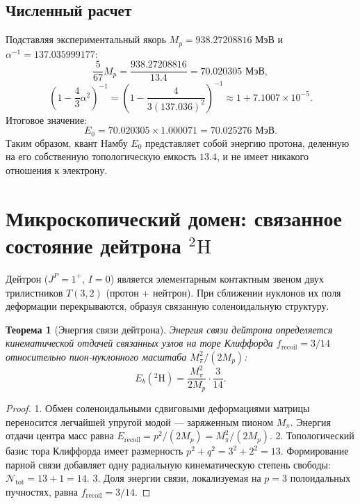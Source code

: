 \documentclass[11pt,a4paper]{article}
\newtheorem{theorem}{Теорема}
\theoremstyle{definition}
\theoremstyle{remark}
\begin{document}
\subsection{Численный расчет}
Подставляя экспериментальный якорь $M_p = 938.27208816\text{ МэВ}$ и $\alpha^{-1} = 137.035999177$:
\begin{equation}
    \frac{5}{67} M_p = \frac{938.27208816}{13.4} = 70.020305\text{ МэВ},
\end{equation}
\begin{equation}
    \left(1 - \frac{4}{3}\alpha^2\right)^{-1} = \left(1 - \frac{4}{3(137.036)^2}\right)^{-1} \approx 1 + 7.1007 \times 10^{-5}.
\end{equation}
Итоговое значение:
\begin{equation}
    E_0 = 70.020305 \times 1.000071 = \mathbf{70.025276\text{ МэВ}}.
\end{equation}
Таким образом, квант Намбу $E_0$ представляет собой энергию протона, деленную на его собственную топологическую емкость $13.4$, и не имеет никакого отношения к электрону.

\section{Микроскопический домен: связанное состояние дейтрона $^2\mathrm{H}$}
Дейтрон ($J^P = 1^+$, $I=0$) является элементарным контактным звеном двух трилистников $T(3,2)$ (протон + нейтрон). При сближении нуклонов их поля деформации перекрываются, образуя связанную соленоидальную структуру.

\begin{theorem}[Энергия связи дейтрона]
\label{thm:deuteron_binding}
Энергия связи дейтрона определяется кинематической отдачей связанных узлов на торе Клиффорда $f_{\mathrm{recoil}} = 3/14$ относительно пион-нуклонного масштаба $M_\pi^2 / (2M_p)$:
\begin{equation}
    E_b(^2\mathrm{H}) = \frac{M_\pi^2}{2 M_p} \cdot \frac{3}{14}.
\end{equation}
\end{theorem}
\begin{proof}
1. Обмен соленоидальными сдвиговыми деформациями матрицы переносится легчайшей упругой модой — заряженным пионом $M_\pi$. Энергия отдачи центра масс равна $E_{\mathrm{recoil}} = p^2 / (2M_p) = M_\pi^2 / (2M_p)$.
2. Топологический базис тора Клиффорда имеет размерность $p^2 + q^2 = 3^2 + 2^2 = 13$. Формирование парной связи добавляет одну радиальную кинематическую степень свободы: $\mathcal{N}_{\mathrm{tot}} = 13 + 1 = 14$.
3. Доля энергии связи, локализуемая на $p=3$ полоидальных пучностях, равна $f_{\mathrm{recoil}} = 3/14$.
\end{proof}
\end{document}
